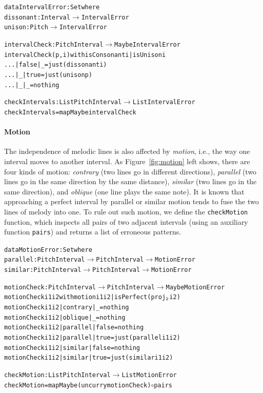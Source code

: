 \begin{alltt}
data IntervalError : Set where
  dissonant : Interval \(\rightarrow\) IntervalError
  unison    : Pitch \(\rightarrow\) IntervalError

intervalCheck : PitchInterval \(\rightarrow\) Maybe IntervalError
intervalCheck (p , i) with isConsonant i | isUnison i
... | false | _    = just (dissonant i)
... | _     | true = just (unison p)
... | _     | _    = nothing

checkIntervals : List PitchInterval \(\rightarrow\) List IntervalError
checkIntervals = mapMaybe intervalCheck
\end{alltt}

\paragraph{Motion}

\MotionCadence

The independence of melodic lines is also affected by \emph{motion},
i.e., the way one interval moves to another interval.
As Figure~\ref{fig:motion} left shows, there are four kinds of motion:
\emph{contrary} (two lines go in different directions),
\emph{parallel} (two lines go in the same direction by the same
distance), \emph{similar} (two lines go in the same direction),
and \emph{oblique} (one line plays the same note).
It is known that approaching a perfect interval by parallel or similar
motion tends to fuse the two lines of melody into one.
To rule out such motion, we define the \texttt{checkMotion}
function, which inspects all pairs of two adjacent intervals (using an
auxiliary function \texttt{pairs}) and returns a list of erroneous patterns.

\begin{alltt}
data MotionError : Set where
  parallel : PitchInterval \(\rightarrow\) PitchInterval \(\rightarrow\) MotionError
  similar  : PitchInterval \(\rightarrow\) PitchInterval \(\rightarrow\) MotionError

motionCheck : PitchInterval \(\rightarrow\) PitchInterval \(\rightarrow\) Maybe MotionError
motionCheck i1 i2 with motion i1 i2 | isPerfect (proj\(\sb{\mathtt{2}}\) i2)
motionCheck i1 i2 | contrary | \_     = nothing
motionCheck i1 i2 | oblique  | \_     = nothing
motionCheck i1 i2 | parallel | false = nothing
motionCheck i1 i2 | parallel | true  = just (parallel i1 i2)
motionCheck i1 i2 | similar  | false = nothing
motionCheck i1 i2 | similar  | true  = just (similar i1 i2)

checkMotion : List PitchInterval \(\rightarrow\) List MotionError
checkMotion = mapMaybe (uncurry motionCheck) \(\circ\) pairs
\end{alltt}


